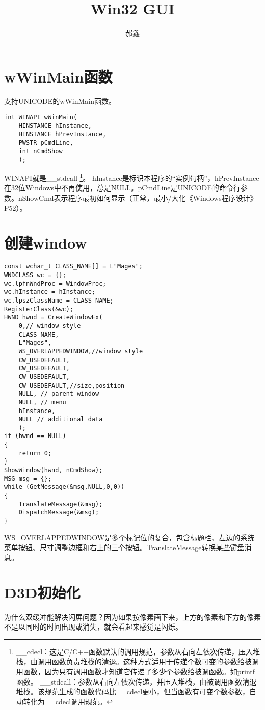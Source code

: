 \documentclass[a4paper,12pt]{article}
\title{Win32 GUI}
\author{郝鑫}
\begin{document}
\maketitle
\tableofcontents
\section{wWinMain函数}
支持UNICODE的wWinMain函数。
\lstset{language=C++,escapechar=`,basicstyle=\ttconsolas,frame=single,breaklines=true}
\begin{lstlisting}
int WINAPI wWinMain(
    HINSTANCE hInstance,
    HINSTANCE hPrevInstance,
    PWSTR pCmdLine,
    int nCmdShow
    );
\end{lstlisting}
WINAPI就是\_\_stdcall
\footnote{
\_\_cdecl：这是C/C++函数默认的调用规范，参数从右向左依次传递，压入堆栈，由调用函数负责堆栈的清退。这种方式适用于传递个数可变的参数给被调用函数，因为只有调用函数才知道它传递了多少个参数给被调函数。如printf函数。
\_\_stdcall：参数从右向左依次传递，并压入堆栈，由被调用函数清退堆栈。该规范生成的函数代码比\_\_cdecl更小，但当函数有可变个数参数，自动转化为\_\_cdecl调用规范。
}。
hInstance是标识本程序的“实例句柄”，hPrevInstance在32位Windows中不再使用，总是NULL。pCmdLine是UNICODE的命令行参数。nShowCmd表示程序最初如何显示（正常，最小/大化《Windows程序设计》P52）。
\section{创建window}
\begin{lstlisting}
const wchar_t CLASS_NAME[] = L"Mages";
WNDCLASS wc = {};
wc.lpfnWndProc = WindowProc;
wc.hInstance = hInstance;
wc.lpszClassName = CLASS_NAME;
RegisterClass(&wc);
HWND hwnd = CreateWindowEx(
    0,// window style
    CLASS_NAME,
    L"Mages",
    WS_OVERLAPPEDWINDOW,//window style
    CW_USEDEFAULT,
    CW_USEDEFAULT,
    CW_USEDEFAULT,
    CW_USEDEFAULT,//size,position
    NULL, // parent window
    NULL, // menu
    hInstance,
    NULL // additional data
    );
if (hwnd == NULL)
{
    return 0;
}
ShowWindow(hwnd, nCmdShow);
MSG msg = {};
while (GetMessage(&msg,NULL,0,0))
{
    TranslateMessage(&msg);
    DispatchMessage(&msg);
}
\end{lstlisting}
WS\_OVERLAPPEDWINDOW是多个标记位的复合，包含标题栏、左边的系统菜单按钮、尺寸调整边框和右上的三个按钮。TranslateMessage转换某些键盘消息。
\section{D3D初始化}
为什么双缓冲能解决闪屏问题？因为如果按像素画下来，上方的像素和下方的像素不是以同时的时间出现或消失，就会看起来感觉是闪烁。
\end{document}

